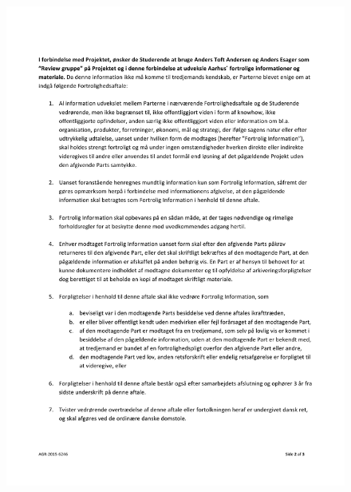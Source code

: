 \begin{figure}[H]
	\includegraphics[width = 1\textwidth]{billeder/FortrolighedsaftaleSide2.pdf}
\end{figure}
\newpage
